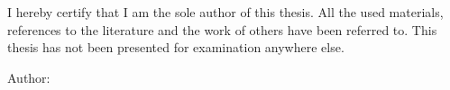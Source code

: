 I hereby certify that I am the sole author of this thesis. All the used materials, references
to the literature and the work of others have been referred to. This thesis has not been
presented for examination anywhere else.

\begin{flushleft}

Author:~\authorName\\
\vspace*{0.5cm}
\signatureDate
 
\end{flushleft}